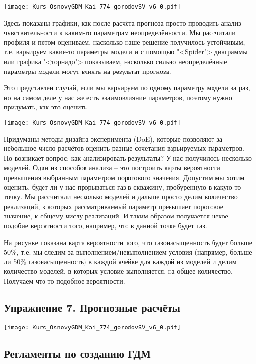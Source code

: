 \documentclass[main.tex]{subfiles}
\begin{document}
\texttt{[image: Kurs\_OsnovyGDM\_Kai\_774\_gorodovSV\_v6\_0.pdf]}

Здесь показаны графики, как после расчёта прогноза просто проводить анализ чувствительности к каким-то параметрам неопределённости.
Мы рассчитали профиля и потом оцениваем, насколько наше решение получилось устойчивым, т.е. варьируем какие-то параметры модели и с помощью "<Spider"> диаграммы или графика "<торнадо"> показываем, насколько сильно неопределённые параметры модели могут влиять на результат прогноза.

Это представлен случай, если мы варьируем по одному параметру модели за раз, но на самом деле у нас же есть взаимовлияние параметров, поэтому нужно придумать, как это оценить.

\texttt{[image: Kurs\_OsnovyGDM\_Kai\_774\_gorodovSV\_v6\_0.pdf]}

Придуманы методы дизайна эксперимента (DoE), которые позволяют за небольшое число расчётов оценить разные сочетания варьируемых параметров.
Но возникает вопрос: как анализировать результаты?
У нас получилось несколько моделей.
Один из способов анализа -- это построить карты вероятности превышения выбранным параметром порогового значения.
Допустим мы хотим оценить, будет ли у нас прорываться газ в скважину, пробуренную в какую-то точку.
Мы рассчитали несколько моделей и дальше просто делим количество реализаций, в которых рассматриваемый параметр превышает пороговое значение, к общему числу реализаций.
И таким образом получается некое подобие вероятности того, например, что в данной точке будет газ.

На рисунке показана карта вероятности того, что газонасыщенность будет больше 50\%, т.е. мы следим за выполнением/невыполнением условия (например, больше ли 50\% газонасыщенность) в каждой ячейке для каждой из моделей и делим количество моделей, в которых условие выполняется, на общее количество.
Получаем что-то подобное вероятности.

\subsection{Упражнение 7. Прогнозные расчёты}

\texttt{[image: Kurs\_OsnovyGDM\_Kai\_774\_gorodovSV\_v6\_0.pdf]}

\subsection{Регламенты по созданию ГДМ}
\end{document}
